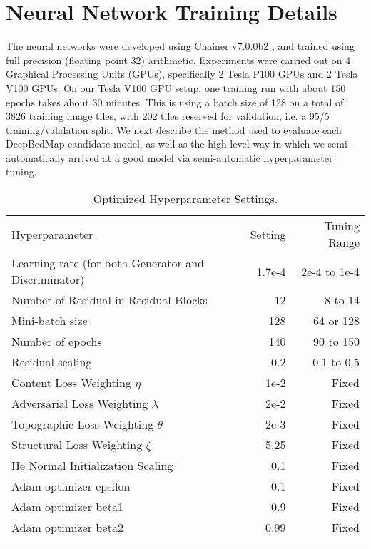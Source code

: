 \documentclass[tc, manuscript]{copernicus}
\begin{document}
\section{Neural Network Training Details} \label{appendix:B}

The neural networks were developed using Chainer v7.0.0b2 \citep{TokuiChainerDeepLearning2019}, and trained using full precision (floating point 32) arithmetic.
Experiments were carried out on 4 Graphical Processing Units (GPUs), specifically 2 Tesla P100 GPUs and 2 Tesla V100 GPUs.
On our Tesla V100 GPU setup, one training run with about 150 epochs takes about 30 minutes.
This is using a batch size of 128 on a total of 3826 training image tiles, with 202 tiles reserved for validation, i.e. a 95/5 training/validation split.
We next describe the method used to evaluate each DeepBedMap candidate model, as well as the high-level way in which we semi-automatically arrived at a good model via semi-automatic hyperparameter tuning.

\begin{table*}[ht]
  \caption{Optimized Hyperparameter Settings.}
  \label{table:B1}
  \begin{tabular}{lrr}
  \tophline
  Hyperparameter & Setting & Tuning Range \\
  \middlehline
  Learning rate (for both Generator and Discriminator) & 1.7e-4 & 2e-4 to 1e-4 \\
  Number of Residual-in-Residual Blocks & 12 & 8 to 14 \\
  Mini-batch size & 128 & 64 or 128 \\
  Number of epochs & 140 & 90 to 150 \\
  Residual scaling & 0.2 & 0.1 to 0.5 \\
  Content Loss Weighting $\eta$ & 1e-2 & Fixed \\
  Adversarial Loss Weighting $\lambda$ & 2e-2 & Fixed \\
  Topographic Loss Weighting $\theta$ & 2e-3 & Fixed \\
  Structural Loss Weighting $\zeta$ & 5.25 & Fixed \\
  He Normal Initialization Scaling & 0.1 & Fixed \\
  Adam optimizer epsilon & 0.1 & Fixed \\
  Adam optimizer beta1 & 0.9 & Fixed \\
  Adam optimizer beta2 & 0.99 & Fixed \\
  \bottomhline
  \end{tabular}
  \belowtable{} %
\end{table*}
\end{document}
